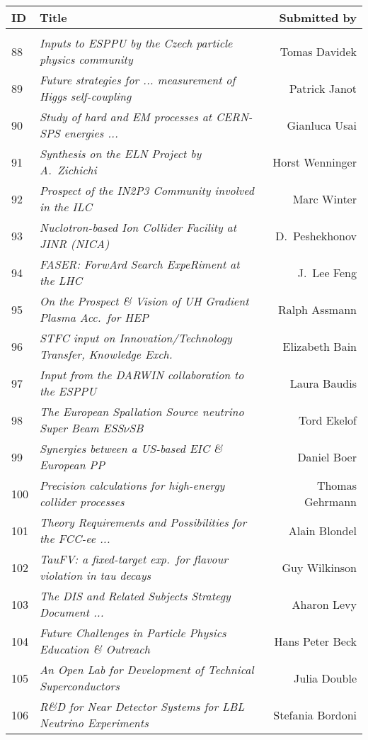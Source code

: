 \newpage
\begin{flushleft}
\begin{tabular}{llr} 
\bf ID & \bf Title & \bf Submitted by \\ \hline 
\vspace*{-3mm} & & \\
88 & \it Inputs to ESPPU by the Czech particle physics community & Tomas Davidek \\
89 & \it Future strategies for ... measurement of Higgs self-coupling & Patrick Janot \\
90 & \it Study of hard and EM processes at CERN-SPS energies ... & Gianluca Usai \\
91 & \it Synthesis on the ELN Project by A.\ Zichichi & Horst Wenninger \\
92 & \it Prospect of the IN2P3 Community involved in the ILC & Marc Winter \\
93 & \it Nuclotron-based Ion Collider Facility at JINR (NICA) & D.\ Peshekhonov \\
94 & \it FASER: ForwArd Search ExpeRiment at the LHC & J.\ Lee Feng \\
95 & \it On the Prospect \& Vision of UH Gradient Plasma Acc.\ for HEP & Ralph Assmann \\
96 & \it STFC input on Innovation/Technology Transfer, Knowledge Exch. & Elizabeth Bain \\
97 & \it Input from the DARWIN collaboration to the ESPPU & Laura Baudis \\
98 & \it The European Spallation Source neutrino Super Beam ESS$\nu$SB & Tord Ekelof \\
99 & \it Synergies between a US-based EIC \& European PP & Daniel Boer \\
100 & \it Precision calculations for high-energy collider processes & Thomas Gehrmann \\
101 & \it Theory Requirements and Possibilities for the FCC-ee ... & Alain Blondel \\
102 & \it TauFV: a fixed-target exp.\ for flavour violation in tau decays & Guy Wilkinson \\
103 & \it The DIS and Related Subjects Strategy Document ... & Aharon Levy \\
104 & \it Future Challenges in Particle Physics Education \& Outreach & Hans Peter Beck \\
105 & \it An Open Lab for Development of Technical Superconductors & Julia Double \\
106 & \it R\&D for Near Detector Systems for LBL Neutrino Experiments & Stefania Bordoni \\

\end{tabular}
\end{flushleft}
